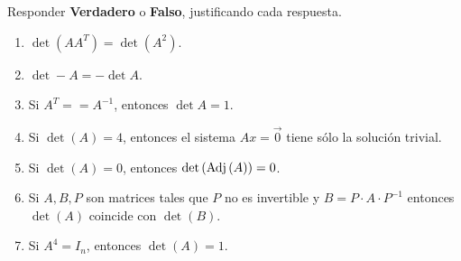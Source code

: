 \item Responder \textbf{Verdadero} o \textbf{Falso}, justificando cada respuesta.
    \begin{enumerate}[label=\listAlph]
        \item \(\det\left(AA^T\right) = \det\left(A^2\right)\).
        \item \(\det -A = -\det A\).
        \item Si \(A^T = = A^{-1}\), entonces \(\det A = 1\).
        \item Si \(\det \left(A\right) = 4\), entonces el sistema \(Ax = \vec{0}\) tiene sólo la solución trivial.
        \item Si \(\det \left(A\right) = 0\), entonces \(\det \left( \text{Adj} \left(A\right)\right) = 0\).
        \item Si \(A, B, P\) son matrices tales que \(P\) no es invertible y \(B = P \cdot A \cdot P^{-1}\) entonces \(\det (A)\) coincide con \(\det (B)\).
        \item Si \(A^4 = I_n\), entonces \(\det(A) = 1\).
    \end{enumerate}

